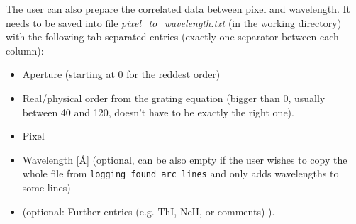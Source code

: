 \documentclass[10pt,a4paper]{article}
\begin{document}
The user can also prepare the correlated data between pixel and wavelength. It needs to be saved into file \textit{pixel\_to\_wavelength.txt} (in the working directory) with the following tab-separated entries (exactly one separator between each column):
\begin{itemize}
  \item Aperture (starting at 0 for the reddest order)
  \item Real/physical order from the grating equation (bigger than 0, usually between 40 and 120, doesn't have to be exactly the right one). %
  \item Pixel
  \item Wavelength [\AA] (optional, can be also empty if the user wishes to copy the whole file from \verb|logging_found_arc_lines| and only adds wavelengths to some lines)
  \item (optional: Further entries (e.g. ThI, NeII, or comments) ).
\end{itemize}
\end{document}
